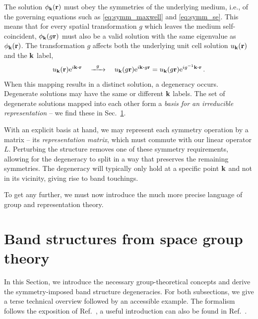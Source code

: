 The solution $\phi_{\vb{k}}(\vb{r})$ must obey the symmetries of the underlying medium, i.e., of the governing equations such as \eqref{eq:symm_maxwell} and \eqref{eq:symm_se}. This means that for every spatial transformation $g$ which leaves the medium self-coincident, $\phi_{\vb{k}}(g \vb{r})$ must also be a valid solution with the same eigenvalue as $\phi_{\vb{k}}(\vb{r})$. The transformation $g$ affects both the underlying unit cell solution $u_{\vb{k}}(\vb{r})$ and the $\vb{k}$ label,
\begin{equation}
u_{\vb{k}}(\vb{r}) \e^{i \vb{k} \vdot \vb{r}}\quad \xrightarrow{\mathmakebox[1.5em]{g}} \quad u_{\vb{k}}(g \vb{r}) \e^{i \vb{k} \vdot g \vb{r}} = u_{\vb{k}}(g \vb{r}) \e^{i g^{-1} \vb{k} \vdot \vb{r}} \,.
\end{equation}
When this mapping results in a distinct solution, a degeneracy occurs. Degenerate solutions may have the same or different $\vb{k}$ labels. The set of degenerate solutions mapped into each other form a \textit{basis for an irreducible representation} -- we find these in Sec.~\ref{sec:symm_groups}.

With an explicit basis at hand, we may represent each symmetry operation by a matrix -- its \textit{representation matrix}, which must commute with our linear operator $L$. Perturbing the structure removes one of these symmetry requirements, allowing for the degeneracy to split in a way that preserves the remaining symmetries. The degeneracy will typically only hold at a specific point $\vb{k}$ and not in its vicinity, giving rise to band touchings.

To get any further, we must now introduce the much more precise language of group and representation theory.

\section{Band structures from space group theory} \label{sec:symm_groups}

In this Section, we introduce the necessary group-theoretical concepts and derive the symmetry-imposed band structure degeneracies. For both subsections, we give a terse technical overview followed by an accessible example. The formalism follows the exposition of Ref.~\cite{Bradley_2009}, a useful introduction can also be found in Ref.~\cite{Cano_2018}. 

